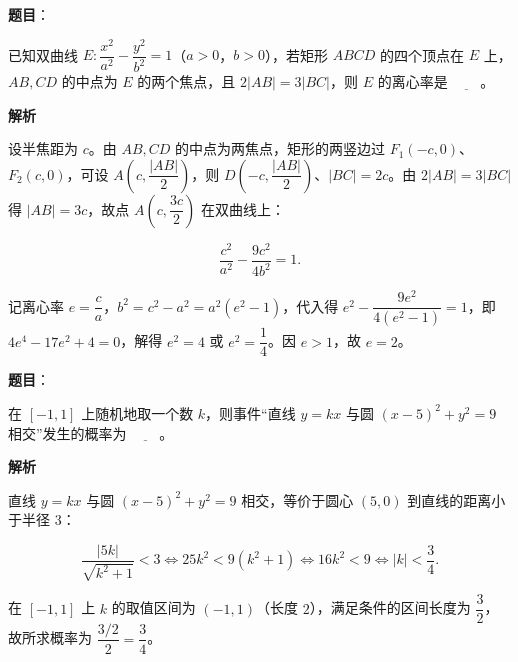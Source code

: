 \begin{answer}

\textbf{题目}：

已知双曲线 \(E:\dfrac{x^{2}}{a^{2}}-\dfrac{y^{2}}{b^{2}}=1\)（\(a>0\)，\(b>0\)），若矩形 \(ABCD\) 的四个顶点在 \(E\) 上，\(AB,CD\) 的中点为 \(E\) 的两个焦点，且 \(2|AB|=3|BC|\)，则 \(E\) 的离心率是 \(\underline{\qquad}\)。

\textbf{解析}

设半焦距为 \(c\)。由 \(AB,CD\) 的中点为两焦点，矩形的两竖边过 \(F_{1}(-c,0)\)、\(F_{2}(c,0)\)，可设 \(A\left(c,\dfrac{|AB|}{2}\right)\)，则 \(D\left(-c,\dfrac{|AB|}{2}\right)\)、\(|BC|=2c\)。由 \(2|AB|=3|BC|\) 得 \(|AB|=3c\)，故点 \(A\left(c,\dfrac{3c}{2}\right)\) 在双曲线上：

\nopagebreak[4]
\[
\dfrac{c^{2}}{a^{2}}-\dfrac{9c^{2}}{4b^{2}}=1.
\]

记离心率 \(e=\dfrac{c}{a}\)，\(b^{2}=c^{2}-a^{2}=a^{2}(e^{2}-1)\)，代入得 \(e^{2}-\dfrac{9e^{2}}{4(e^{2}-1)}=1\)，即 \(4e^{4}-17e^{2}+4=0\)，解得 \(e^{2}=4\) 或 \(e^{2}=\dfrac{1}{4}\)。因 \(e>1\)，故 \(e=2\)。


\end{answer}
\begin{answer}

\textbf{题目}：

在 \([-1,1]\) 上随机地取一个数 \(k\)，则事件“直线 \(y=kx\) 与圆 \((x-5)^{2}+y^{2}=9\) 相交”发生的概率为 \(\underline{\qquad}\)。

\textbf{解析}

直线 \(y=kx\) 与圆 \((x-5)^{2}+y^{2}=9\) 相交，等价于圆心 \((5,0)\) 到直线的距离小于半径 \(3\)：

\nopagebreak[4]
\[
\dfrac{|5k|}{\sqrt{k^{2}+1}}<3\iff 25k^{2}<9(k^{2}+1)\iff 16k^{2}<9\iff |k|<\dfrac{3}{4}.
\]

在 \([-1,1]\) 上 \(k\) 的取值区间为 \((-1,1)\)（长度 \(2\)），满足条件的区间长度为 \(\dfrac{3}{2}\)，故所求概率为 \(\dfrac{3/2}{2}=\dfrac{3}{4}\)。


\end{answer}
